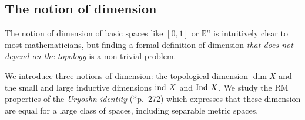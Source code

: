 \documentclass[reqno]{amsart}
\def\R{{\mathbb  R}}
\numberwithin{equation}{section}
\numberwithin{thm}{section}
\begin{document}
\subsection{The notion of dimension}\label{diemensie}
The notion of dimension of basic spaces like $[0,1]$ or $\R^{n}$ is intuitively clear to most mathematicians, but finding a formal definition of dimension \emph{that does not depend on the topology} is a non-trivial problem.  

\smallskip

We introduce three notions of dimension: the  topological dimension $\dim X$ and the small and large inductive dimensions $\textup{ind } X$ and $\textup{Ind } X$.  We study the RM properties of the \emph{Uryoshn identity} (\cite{enc2}*{p.\ 272}) which expresses that these dimension are equal for a large class of spaces, including separable metric spaces.

\smallskip
\end{document}
